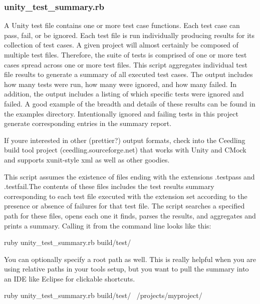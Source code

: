 \subsubsection*{{\ttfamily unity\+\_\+test\+\_\+summary.\+rb}}

A Unity test file contains one or more test case functions. Each test case can pass, fail, or be ignored. Each test file is run individually producing results for its collection of test cases. A given project will almost certainly be composed of multiple test files. Therefore, the suite of tests is comprised of one or more test cases spread across one or more test files. This script aggregates individual test file results to generate a summary of all executed test cases. The output includes how many tests were run, how many were ignored, and how many failed. In addition, the output includes a listing of which specific tests were ignored and failed. A good example of the breadth and details of these results can be found in the {\ttfamily examples} directory. Intentionally ignored and failing tests in this project generate corresponding entries in the summary report.

If you\textquotesingle{}re interested in other (prettier?) output formats, check into the Ceedling build tool project (ceedling.\+sourceforge.\+net) that works with Unity and C\+Mock and supports xunit-\/style xml as well as other goodies.

This script assumes the existence of files ending with the extensions {\ttfamily .testpass} and {\ttfamily .testfail}.The contents of these files includes the test results summary corresponding to each test file executed with the extension set according to the presence or absence of failures for that test file. The script searches a specified path for these files, opens each one it finds, parses the results, and aggregates and prints a summary. Calling it from the command line looks like this\+:


\begin{DoxyCode}
ruby unity\_test\_summary.rb build/test/
\end{DoxyCode}


You can optionally specify a root path as well. This is really helpful when you are using relative paths in your tools\textquotesingle{} setup, but you want to pull the summary into an I\+DE like Eclipse for clickable shortcuts.


\begin{DoxyCode}
ruby unity\_test\_summary.rb build/test/ ~/projects/myproject/
\end{DoxyCode}


